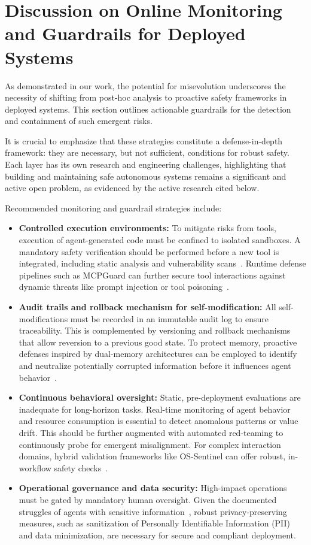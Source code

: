 \documentclass{article} %
\begin{document}
{
\section{Discussion on Online Monitoring and Guardrails for Deployed Systems}
\label{app:suggestion_for_deploying}
As demonstrated in our work, the potential for misevolution underscores the necessity of shifting from post-hoc analysis to proactive safety frameworks in deployed systems. This section outlines actionable guardrails for the detection and containment of such emergent risks.

It is crucial to emphasize that these strategies constitute a defense-in-depth framework: they are necessary, but not sufficient, conditions for robust safety. Each layer has its own research and engineering challenges, highlighting that building and maintaining safe autonomous systems remains a significant and active open problem, as evidenced by the active research cited below. 

Recommended monitoring and guardrail strategies include:
\begin{itemize}
    \item \textbf{Controlled execution environments:} To mitigate risks from tools, execution of agent-generated code must be confined to isolated sandboxes. A mandatory safety verification should be performed before a new tool is integrated, including static analysis and vulnerability scans~\citep{mcpscan}. Runtime defense pipelines such as MCPGuard can further secure tool interactions against dynamic threats like prompt injection or tool poisoning~\citep{xing2025mcp, wang2025mcpguard}.
    \item \textbf{Audit trails and rollback mechanism for self-modification:} All self-modifications must be recorded in an immutable audit log to ensure traceability. This is complemented by versioning and rollback mechanisms that allow reversion to a previous good state. To protect memory, proactive defenses inspired by dual-memory architectures can be employed to identify and neutralize potentially corrupted information before it influences agent behavior~\citep{wei2025memguard}.
    \item \textbf{Continuous behavioral oversight:} Static, pre-deployment evaluations are inadequate for long-horizon tasks. Real-time monitoring of agent behavior and resource consumption is essential to detect anomalous patterns or value drift\citep{liu2026agentdogdiagnosticguardrailframework}. This should be further augmented with automated red-teaming to continuously probe for emergent misalignment. For complex interaction domains, hybrid validation frameworks like OS-Sentinel can offer robust, in-workflow safety checks~\citep{sun2025sentinel}.
    \item \textbf{Operational governance and data security:} High-impact operations must be gated by mandatory human oversight. Given the documented struggles of agents with sensitive information~\citep{zharmagambetov2025agentdam}, robust privacy-preserving measures, such as sanitization of Personally Identifiable Information (PII) and data minimization, are necessary for secure and compliant deployment.
\end{itemize}

}
\end{document}
